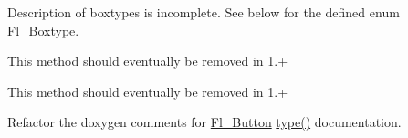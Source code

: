 
\begin{DoxyRefList}
\item[\label{todo__todo000003}%
\Hypertarget{todo__todo000003}%
Module \hyperlink{_enumerations_8_h_amgrp2126f69af9d5d7bac9ff67a532026acc}{Box Types} ]Description of boxtypes is incomplete. See below for the defined enum Fl\+\_\+\+Boxtype.  
\item[\label{todo__todo000007}%
\Hypertarget{todo__todo000007}%
Member \hyperlink{class_fl___browser___a4d59d5c7d78393a7a5d5bfaa01694580}{Fl\+\_\+\+Browser\+\_\+\+:\+:scrollbar\+\_\+width} (int width)]This method should eventually be removed in 1.+  
\item[\label{todo__todo000006}%
\Hypertarget{todo__todo000006}%
Member \hyperlink{class_fl___browser___a397cd7d2550ca3d87032fa1ffd3e4bbc}{Fl\+\_\+\+Browser\+\_\+\+:\+:scrollbar\+\_\+width} () const]This method should eventually be removed in 1.+  
\item[\label{todo__todo000008}%
\Hypertarget{todo__todo000008}%
Class \hyperlink{class_fl___button}{Fl\+\_\+\+Button} ]Refactor the doxygen comments for \hyperlink{class_fl___button}{Fl\+\_\+\+Button} \hyperlink{class_fl___widget_adda2e8f162b3ea0332eb8d762350bbd5}{type()} documentation.


\end{DoxyRefList}

